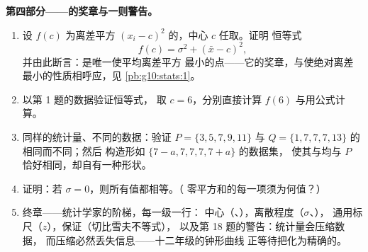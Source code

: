 \begin{problem}
\medskip
\noindent\textbf{第四部分——的奖章与一则警告。}
\begin{enumerate}[resume]
  \item 设 $f(c)$ 为离差平方
        $(x_i - c)^2$ 的，中心 $c$ 任取。证明
        恒等式
        \[
        f(c) = \sigma^2 + (\bar x - c)^2 ,
        \]
        并由此断言：是唯一使平均离差平方
        最小的点——它的奖章，与使绝对离差
        最小的性质相呼应，见
        \cref{pb:g10:stats:1}。
  \item 以第 1 题的数据验证恒等式，
        取 $c = 6$，分别直接计算 $f(6)$ 与用公式计算。
  \item 同样的统计量、不同的数据：验证
        $P = \{3, 5, 7, 9, 11\}$ 与 $Q = \{1, 7, 7, 7, 13\}$
        的相同而不同；然后
        构造形如
        $\{7 - a, 7, 7, 7, 7 + a\}$ 的数据集，
        使其与均与 $P$ 恰好相同，却自有一种形状。
  \item 证明：若 $\sigma = 0$，则所有值都相等。（
        零平方和的每一项须为何值？）
  \item 终章——统计学家的阶梯，每一级一行：
        中心（、），离散程度（$\sigma$、），
        通用标尺（$z$），保证（切比雪夫不等式），
        以及第 18 题的警告：统计量会压缩数据，
        而压缩必然丢失信息——十二年级的钟形曲线
        正等待把化为精确的。
\end{enumerate}
\end{problem}
